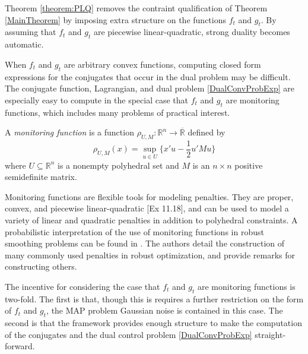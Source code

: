 \documentclass[12pt]{article}
\theoremstyle{remark}
\theoremstyle{remark}
\begin{document}
Theorem \ref{theorem:PLQ} removes the contraint qualification of
Theorem \ref{MainTheorem} by imposing extra structure on the
functions $f_{t}$ and $g_{t}$. By assuming that $f_{t}$ and $g_{t}$
are piecewise linear-quadratic, strong duality becomes automatic. 

When $f_{t}$ and $g_{t}$ are arbitrary convex functions, computing
closed form expressions for the conjugates that occur in the dual
problem may be difficult. 
The conjugate function, Lagrangian, and dual problem
\ref{DualConvProbExp} are especially easy to compute in the
special case that $f_{t}$ and $g_{t}$ are monitoring functions, which
includes many problems of practical interest.

A \emph{monitoring function} is a function $\rho_{U,M} :\mathbb{R}^{n} \to
\overline{\mathbb{R}}$ defined by
$$\rho_{U, M}(x) = \sup_{u \in U}\{ x'u-\frac{1}{2} u' M u \}$$
where $U \subseteq \mathbb{R}^{n}$ is a nonempty polyhedral set and
$M$ is an $n \times n$ positive semidefinite matrix. 

Monitoring functions are flexible tools for modeling penalties. They
are proper, convex, and piecewise linear-quadratic \cite{VarAnal}[Ex
11.18], and can be used to model a variety of linear and quadratic
penalties in addition to polyhedral constraints. A probabilistic interpretation
of the use of monitoring functions in robust smoothing problems can be found
in \cite{aravkin}. The authors detail the construction of many
commonly used penalties in robust optimization, and provide remarks
for constructing others.

The incentive for considering the case that $f_{t}$ and $g_{t}$ are
monitoring functions is two-fold. The first is that, though this is
requires a further restriction on the form of $f_{t}$ and $g_{t}$, the
MAP problem Gaussian noise  is contained in this
case. The second is that the framework provides enough structure to
make the computation of the conjugates and the dual control problem
\ref{DualConvProbExp} straight-forward.
\end{document}
